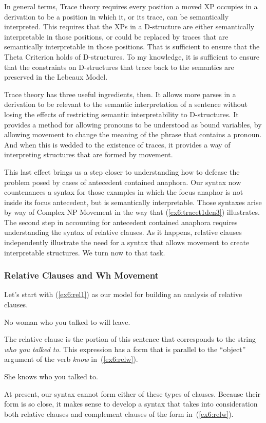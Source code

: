 In general terms, Trace theory requires every position a moved XP occupies in a derivation to be a position in which it, or its trace, can be semantically interpreted. This requires that the XPs in a D-structure are either semantically interpretable in those positions, or could be replaced by traces that are semantically interpretable in those positions. That is sufficient to ensure that the Theta Criterion holds of D-structures. To my knowledge, it is sufficient to ensure that the constraints on D-structures that trace back to the semantics are preserved in the Lebeaux Model.

Trace theory has three useful ingredients, then. It allows more parses in a derivation to be relevant to the semantic interpretation of a sentence without losing the effects of restricting semantic interpretability to D-structures. It provides a method for allowing pronouns to be understood as bound variables, by allowing movement to change the meaning of the phrase that contains a pronoun. And when this is wedded to the existence of traces, it provides a way of interpreting structures that are formed by movement. 

This last effect brings us a step closer to understanding how to defease the problem posed by cases of antecedent contained anaphora. Our syntax now countenances a syntax for those examples in which the focus anaphor is not inside its focus antecedent, but is semantically interpretable. Those syntaxes arise by way of Complex NP Movement in the way that (\ref{ex6:tracet1den3}) illustrates. The second step in accounting for antecedent contained anaphora requires understanding the syntax of relative clauses. As it happens, relative clauses independently illustrate the need for a syntax that allows movement to create interpretable structures. We turn now to that task.

\subsubsection{Relative Clauses and Wh Movement}
\label{sec:relclause}

Let's start with (\ref{ex6:rel1}) as our model for building an analysis of relative clauses.
\begin{exe}
\raggedright
	\ex \label{ex6:rel1}
	No woman who you talked to will leave.
\end{exe} 
The relative clause is the portion of this sentence that corresponds to the string \emph{who you talked to}. This expression has a form that is parallel to the ``object'' argument of the verb \emph{know} in~(\ref{ex6:relw}).
\begin{exe}
\raggedright
	\ex \label{ex6:relw}
	She knows who you talked to.
\end{exe}
At present, our syntax cannot form either of these types of clauses. Because their form is so close, it makes sense to develop a syntax that takes into consideration both relative clauses and complement clauses of the form in~(\ref{ex6:relw}). 

